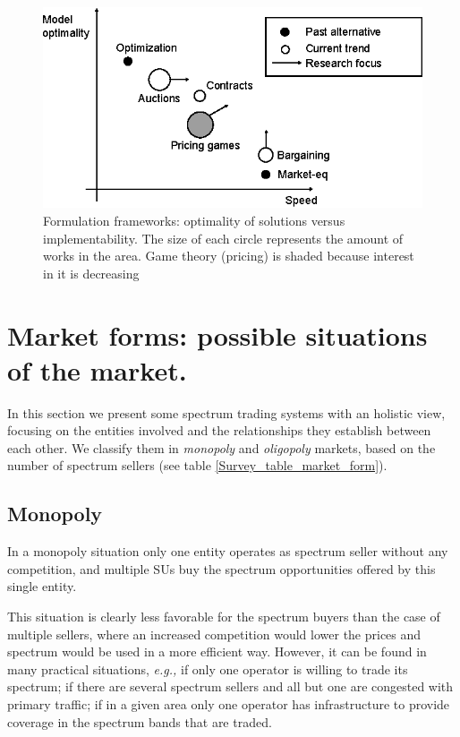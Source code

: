 \begin{figure}[!ht]
  \begin{center}
  \includegraphics[scale=1.25]{Fig4.eps}
  \end{center}
  \caption{Formulation frameworks: optimality of solutions versus implementability. The size of each circle represents the amount of works in the area. Game theory (pricing) is shaded because interest in it is decreasing}
   \label{fig:frameworks}
\end{figure}

\section{Market forms: possible situations of the market.}\label{sec:Market}

In this section we present some spectrum trading systems with an holistic view, focusing on the entities involved and the relationships they establish between each other. We classify them in \textit{monopoly} and \textit{oligopoly} markets, based on the number of spectrum sellers (see table \ref{Survey_table_market_form}).

\subsection{Monopoly}
\label{subsec:Mono}
In a monopoly situation only one entity operates as spectrum seller without any competition, and multiple SUs buy the spectrum opportunities offered by this single entity.

This situation is clearly less favorable for the spectrum buyers than the case of multiple sellers, where an increased competition would lower the prices and spectrum would be used in a more efficient way. However, it can be found in many practical situations, \textit{e.g.,} if only one operator is willing to trade its spectrum; if there are several spectrum sellers and all but one are congested with primary traffic; if in a given area only one operator has infrastructure to provide coverage in the spectrum bands that are traded.


